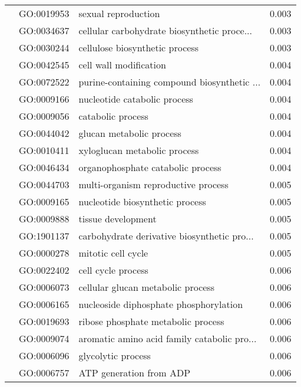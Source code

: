 \begin{longtable}{lllr}
   & GO:0019953 &                          sexual reproduction &         0.003 \\
   & GO:0034637 &  cellular carbohydrate biosynthetic proce... &         0.003 \\
   & GO:0030244 &               cellulose biosynthetic process &         0.003 \\
   & GO:0042545 &                       cell wall modification &         0.004 \\
   & GO:0072522 &  purine-containing compound biosynthetic ... &         0.004 \\
   & GO:0009166 &                 nucleotide catabolic process &         0.004 \\
   & GO:0009056 &                            catabolic process &         0.004 \\
   & GO:0044042 &                     glucan metabolic process &         0.004 \\
   & GO:0010411 &                 xyloglucan metabolic process &         0.004 \\
   & GO:0046434 &            organophosphate catabolic process &         0.004 \\
   & GO:0044703 &          multi-organism reproductive process &         0.005 \\
   & GO:0009165 &              nucleotide biosynthetic process &         0.005 \\
   & GO:0009888 &                           tissue development &         0.005 \\
   & GO:1901137 &  carbohydrate derivative biosynthetic pro... &         0.005 \\
   & GO:0000278 &                           mitotic cell cycle &         0.005 \\
   & GO:0022402 &                           cell cycle process &         0.006 \\
   & GO:0006073 &            cellular glucan metabolic process &         0.006 \\
   & GO:0006165 &       nucleoside diphosphate phosphorylation &         0.006 \\
   & GO:0019693 &           ribose phosphate metabolic process &         0.006 \\
   & GO:0009074 &  aromatic amino acid family catabolic pro... &         0.006 \\
   & GO:0006096 &                           glycolytic process &         0.006 \\
   & GO:0006757 &                      ATP generation from ADP &         0.006 \\

\end{longtable}
